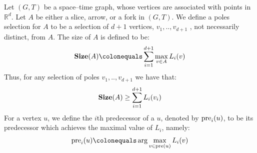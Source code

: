   \begin{definition}
    Let $(G,T)$ be a space--time graph, whose vertices are associated with points in $\mathbb{R}^{d}$. Let $A$ be either a slice, arrow, or a fork in $(G,T)$. We define a poles selection for $A$ to be a selection of $d+1$ vertices, $v_{1},..,v_{d+1}$ , not necessarily distinct, from $A$. The size of $A$ is defined to be:
    \begin{equation*}
      \begin{split}
        \Size{A} \colonequals  \sum_{i=1}^{d+1}  \max_{v\in A} L_{i}(v) 
      \end{split}
    \end{equation*} 
    Thus, for any selection of poles $v_{1},..,v_{d+1}$ we have that: 
    \begin{equation*}
      \begin{split}
        \mathbf{Size}(A) \ge \sum_{i=1}^{d+1} L_i(v_i) 
      \end{split}
    \end{equation*} 
    For a vertex $u$, we define the $i$th predecessor of a $u$, denoted by $\text{pre}_{i}(u)$, to be its predecessor which achieves the maximal value of $L_{i}$,  namely:
    \begin{equation*}
      \begin{split}
        \prei{u} \colonequals  \arg \max_{v\in \pre{u}} L_{i}(v) 
      \end{split}
    \end{equation*}
  \end{definition}
    
